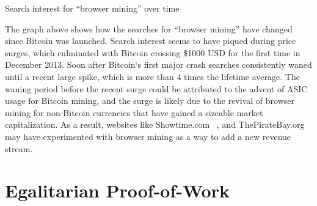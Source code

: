 \begin{center}
	\caption{Search interest for ``browser mining'' over time}
\end{center}

The graph above shows how the searches for ``browser mining'' have changed since Bitcoin was launched. Search interest seems to have piqued during price surges, which culminated with Bitcoin crossing \$1000 USD for the first time in December 2013. Soon after Bitcoin`s first major crash searches consistently waned until a recent large spike, which is more than 4 times the lifetime average. The waning period before the recent surge could be attributed to the advent of ASIC usage for Bitcoin mining, and the surge is likely due to the revival of browser mining for non-Bitcoin currencies that have gained a sizeable market capitalization. As a result, websites like Showtime.com ~\cite{showtimehive}, and ThePirateBay.org ~\cite{piratesbayhive} may have experimented with browser mining as a way to add a new revenue stream.

\section{Egalitarian Proof-of-Work}

